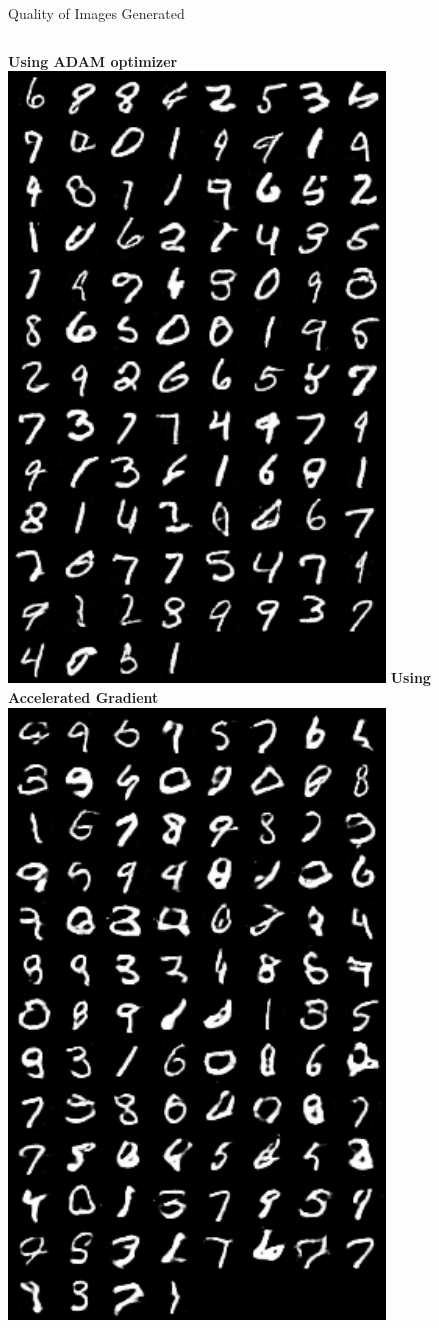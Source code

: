 \documentclass[10pt]{beamer}
\begin{document}
\begin{frame}{Quality of Images Generated}
\begin{columns}
\centering
\textbf{Using ADAM optimizer}
\includegraphics[width=0.75\textwidth]{./images/adam-dcgan.png}
\centering
\textbf{Using Accelerated Gradient}
\includegraphics[width=0.75\textwidth]{./images/nag-dcgan.png}

\end{columns}
\end{frame}
\end{document}
